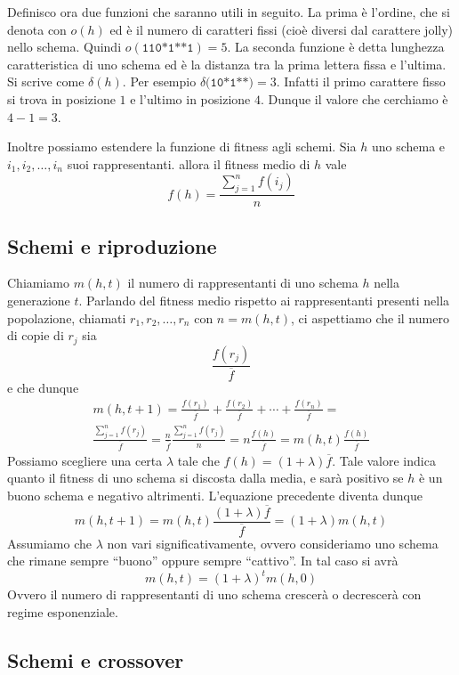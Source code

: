 \documentclass[a4paper, 11pt]{article}
\newcommand{\code}{\texttt}
\begin{document}
Definisco ora due funzioni che saranno utili in seguito. La prima \`e l'ordine,
che si denota con $o(h)$ ed \`e il numero di caratteri fissi (cio\`e diversi dal
carattere jolly) nello schema. Quindi $o(\code{110*1**1})=5$. La seconda
funzione \`e detta lunghezza caratteristica di uno schema ed \`e la distanza tra
la prima lettera fissa e l'ultima. Si scrive come $\delta(h)$. Per esempio
$\delta( \code{10*1**)} = 3$. Infatti il primo carattere fisso si trova in
posizione $1$ e l'ultimo in posizione $4$.  Dunque il valore che cerchiamo \`e
$4-1=3$.

Inoltre possiamo estendere la funzione di fitness agli schemi. Sia $h$ uno
schema e $i_1, i_2, \ldots ,i_n$ suoi rappresentanti. allora il fitness medio di
$h$ vale $$f(h)=\frac{\sum\limits_{j=1}^n f(i_j)}{n}$$



\subsection{Schemi e riproduzione}

Chiamiamo $m(h, t)$ il numero di rappresentanti di uno schema $h$ nella
generazione $t$. Parlando del fitness medio rispetto ai rappresentanti presenti
nella popolazione, chiamati $r_1, r_2, \ldots, r_n$ con $n=m(h,t)$, ci
aspettiamo che il numero di copie di $r_j$ sia 
$$\frac{f(r_j)}{\overline{f}}$$
e che dunque
\begin{align*}
m(h,t+1) =
\frac{f(r_1)}{\overline{f}}
+\frac{f(r_2)}{\overline{f}}+ \cdots +
\frac{f(r_n)}{\overline{f}} =\\
\frac{\sum\limits_{j=1}^n f(r_j)}{\overline{f}} =
\frac{n}{\overline{f}} \frac{\sum\limits_{j=1}^n f(r_j)} {n} = n \frac{f(h)}{\overline{f}} = m(h,t)\frac{f(h)}{\overline{f}}
\end{align*}
Possiamo scegliere una certa $\lambda$ tale che $f(h)=(1+\lambda
)\overline{f}$. Tale valore indica quanto il fitness di uno schema si discosta
dalla media, e sar\`a positivo se $h$ \`e un buono schema e negativo
altrimenti. L'equazione precedente diventa dunque
$$m(h,t+1)=m(h,t)\frac{(1+\lambda )\overline{f}}{\overline{f}}=(1+\lambda
)m(h,t)$$
Assumiamo che $\lambda$ non vari significativamente, ovvero consideriamo uno
schema che rimane sempre ``buono'' oppure sempre ``cattivo''. In tal caso si
avr\`a
$$m(h,t)=(1+\lambda)^tm(h,0)$$
Ovvero il numero di rappresentanti di uno schema crescer\`a o decrescer\`a con
regime esponenziale.



\subsection{Schemi e crossover}
\end{document}
